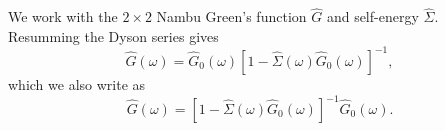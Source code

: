 \documentclass{article}
\begin{document}
We work with the $2\times2$ Nambu Green's function $\hat G$ and self-energy $\hat\Sigma$.
Resumming the Dyson series gives
\begin{equation}
\hat G(\omega) = \hat G_0(\omega)\left[1 - \hat\Sigma(\omega)\hat G_0(\omega)\right]^{-1} ,
\label{eq:d1}
\end{equation}
which we also write as
\begin{equation}
\hat G(\omega) = \left[1 - \hat\Sigma(\omega)\hat G_0(\omega)\right]^{-1} \hat G_0(\omega) .
\label{eq:d2}
\end{equation}
\end{document}
